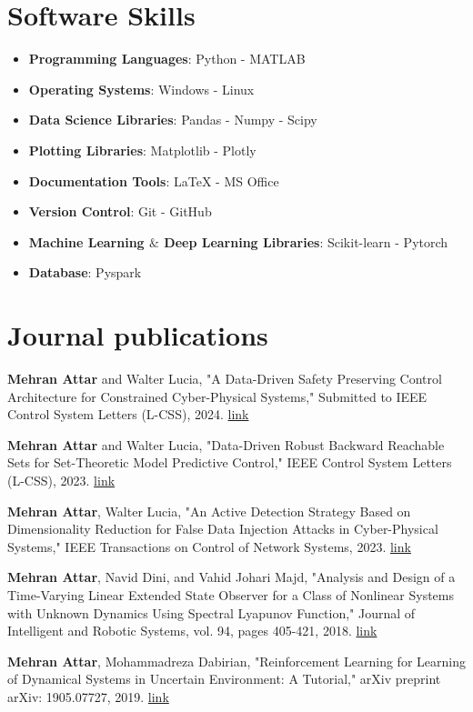 \documentclass[letterpaper,10.8pt]{article}
\begin{document}
\section{Software Skills}
\begin{multicols}{2}
\begin{itemize}
    \item \textbf{Programming Languages}: Python - MATLAB
    \item \textbf{Operating Systems}: Windows - Linux
    \item \textbf{Data Science Libraries}: Pandas - Numpy - Scipy
    \item \textbf{Plotting Libraries}: Matplotlib - Plotly
    \item \textbf{Documentation Tools}: LaTeX - MS Office
    \item \textbf{Version Control}: Git - GitHub
    \item \textbf{Machine Learning $\&$ Deep Learning Libraries}: Scikit-learn - Pytorch
    \item \textbf{Database}: Pyspark
\end{itemize}
\end{multicols}


\section{Journal publications}
\begin{enumerate}[label={[\arabic*]}]
\item \textbf{Mehran Attar} and Walter Lucia, "A Data-Driven Safety Preserving Control Architecture for Constrained Cyber-Physical Systems," Submitted to IEEE Control System Letters (L-CSS), 2024. \href{https://arxiv.org/abs/2312.00658}{link}
% 
\item \textbf{Mehran Attar} and Walter Lucia, "Data-Driven Robust Backward Reachable Sets for Set-Theoretic Model Predictive Control," IEEE Control System Letters (L-CSS), 2023. \href{https://ieeexplore.ieee.org/abstract/document/10153604}{link}
% 
  \item \textbf{Mehran Attar}, Walter Lucia, "An Active Detection Strategy Based on Dimensionality Reduction for False Data Injection Attacks in Cyber-Physical Systems," IEEE Transactions on Control of Network Systems, 2023. \href{https://ieeexplore.ieee.org/abstract/document/10042059}{link}
  \item \textbf{Mehran Attar}, Navid Dini, and Vahid Johari Majd, "Analysis and Design of a Time-Varying Linear
Extended State Observer for a Class of Nonlinear Systems with Unknown Dynamics Using Spectral
Lyapunov Function," Journal of Intelligent and Robotic Systems, vol. 94, pages 405-421, 2018. \href{https://link.springer.com/article/10.1007/s10846-018-0935-0}{link}
  \item \textbf{Mehran Attar}, Mohammadreza Dabirian, "Reinforcement Learning for Learning of Dynamical
Systems in Uncertain Environment: A Tutorial," arXiv preprint arXiv: 1905.07727, 2019. \href{https://arxiv.org/abs/1905.07727}{link}
\end{enumerate}
\end{document}
